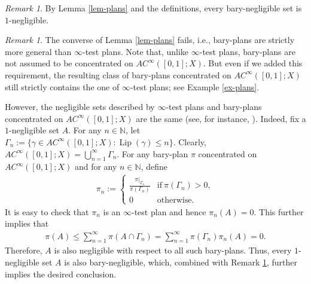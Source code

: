 \documentclass[11pt]{amsart}
\theoremstyle{definition}
\theoremstyle{remark}
\newtheorem{remark}[theorem]{Remark}
\numberwithin{equation}{section}
\begin{document}
\begin{remark}\label{rem:plans}
By Lemma \ref{lem-plans} and the definitions, every bary-negligible set is $1$-negligible.
\end{remark}

\begin{remark}\label{rem:same-neg}
The converse of Lemma \ref{lem-plans} fails, i.e., bary-plans are strictly more general than
$\infty$-test plans. Note that, unlike $\infty$-test plans,
bary-plans are not assumed to be concentrated on $AC^\infty([0,1];X)$.
But even if we added this requirement, the resulting
class of bary-plans concentrated on $AC^\infty([0,1];X)$ still strictly contains the one of
$\infty$-test plans;
see Example \ref{ex-plans}.

However, the negligible sets described by $\infty$-test plans
and bary-plans concentrated on
$AC^\infty([0,1];X)$ are the same (see,
for instance, \cite[p.\,40]{D14}). Indeed, fix a $1$-negligible set $A$.
For any $n\in\mathbb{N}$, let
$\Gamma_n:=\{\gamma\in AC^\infty([0,1];X):
{\operatorname{Lip}}(\gamma)\le n\}$.
Clearly, $AC^\infty([0,1];X)= \bigcup_{n=1}^\infty\Gamma_n$. For any
bary-plan $\pi$ concentrated on $AC^\infty([0,1];X)$ and for any
$n\in\mathbb{N}$,
define
\begin{align*}
\pi_n:=
\begin{cases}
\frac{\pi|_{\Gamma_n}}{\pi(\Gamma_n)} & \mbox{if}\ \pi(\Gamma_n)>0,\\
0 & \mbox{otherwise}.
\end{cases}
\end{align*}
It is easy to check that $\pi_n$ is an $\infty$-test plan and hence $\pi_n(A)=0$.
This further implies that
\begin{align*}
\pi(A)\le \sum_{n=1}^{\infty}\pi(A\cap \Gamma_n) = \sum_{n=1}^{\infty}
\pi(\Gamma_n)\pi_n(A)=0.
\end{align*}
Therefore, $A$ is also negligible with respect to all such bary-plans.
Thus, every $1$-negligible set $A$ is also bary-negligible, which,
combined with Remark \ref{rem:plans}, further implies the desired conclusion.
\end{remark}
\end{document}
